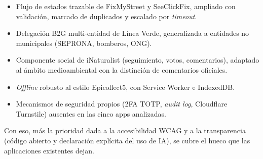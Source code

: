 \begin{itemize}[leftmargin=1.2cm, itemsep=2pt]
  \item Flujo de estados trazable de FixMyStreet y SeeClickFix, ampliado con validación, marcado de duplicados y escalado por \textit{timeout}.
  \item Delegación B2G multi-entidad de Línea Verde, generalizada a entidades no municipales (SEPRONA, bomberos, ONG).
  \item Componente social de iNaturalist (seguimiento, votos, comentarios), adaptado al ámbito medioambiental con la distinción de comentarios oficiales.
  \item \textit{Offline} robusto al estilo Epicollect5, con Service Worker e IndexedDB.
  \item Mecanismos de seguridad propios (2FA TOTP, \textit{audit log}, Cloudflare Turnstile) ausentes en las cinco apps analizadas.
\end{itemize}

Con eso, más la prioridad dada a la accesibilidad WCAG y a la transparencia (código abierto y declaración explícita del uso de IA), se cubre el hueco que las aplicaciones existentes dejan.
